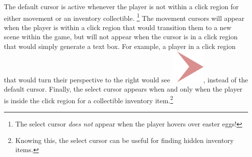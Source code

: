 \documentclass{article}
\begin{document}
		The default cursor is active whenever the player is not within a click region for either movement or an inventory collectible. \footnote{The select cursor \emph{does not} appear when the player hovers over easter eggs!} The movement cursors will appear when the player is within a click region that would transition them to a new scene within the game, but will not appear when the cursor is in a click region that would simply generate a text box. For example, a player in a click region that would turn their perspective to the right would see \includegraphics[scale=0.15]{UMimages/Right}, instead of the default cursor. Finally, the select cursor appears when and only when the player is inside the click region for a collectible inventory item.\footnote{Knowing this, the select cursor can be useful for finding hidden inventory items.}
		
\end{document}
